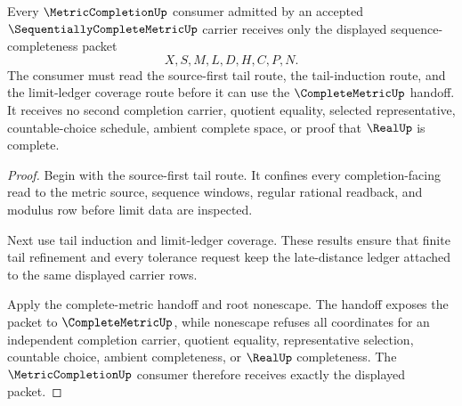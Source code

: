 \begin{theorem}
\label{thm:sequentially-complete-metric-completion-consumer-route}
Every $\MetricCompletionUp$ consumer admitted by an accepted $\SequentiallyCompleteMetricUp$ carrier receives only the displayed sequence-completeness packet
$$
X,S,M,L,D,H,C,P,N .
$$
The consumer must read the source-first tail route, the tail-induction route, and the limit-ledger coverage route before it can use the $\CompleteMetricUp$ handoff. It receives no second completion carrier, quotient equality, selected representative, countable-choice schedule, ambient complete space, or proof that $\RealUp$ is complete.
\end{theorem}
\begin{proof}
Begin with the source-first tail route. It confines every completion-facing read to the metric source, sequence windows, regular rational readback, and modulus row before limit data are inspected.

Next use tail induction and limit-ledger coverage. These results ensure that finite tail refinement and every tolerance request keep the late-distance ledger attached to the same displayed carrier rows.

Apply the complete-metric handoff and root nonescape. The handoff exposes the packet to $\CompleteMetricUp$, while nonescape refuses all coordinates for an independent completion carrier, quotient equality, representative selection, countable choice, ambient completeness, or $\RealUp$ completeness. The $\MetricCompletionUp$ consumer therefore receives exactly the displayed packet.
\end{proof}

